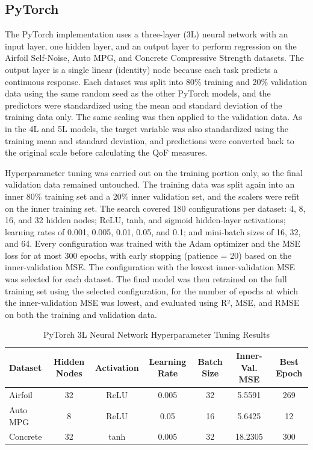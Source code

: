\documentclass{article}
\begin{document}
\subsection{PyTorch}
The PyTorch implementation uses a three-layer (3L) neural network with an input layer, one hidden layer, and an output layer to perform regression on the Airfoil Self-Noise, Auto MPG, and Concrete Compressive Strength datasets. The output layer is a single linear (identity) node because each task predicts a continuous response. Each dataset was split into 80\% training and 20\% validation data using the same random seed as the other PyTorch models, and the predictors were standardized using the mean and standard deviation of the training data only. The same scaling was then applied to the validation data. As in the 4L and 5L models, the target variable was also standardized using the training mean and standard deviation, and predictions were converted back to the original scale before calculating the QoF measures.
\medskip

Hyperparameter tuning was carried out on the training portion only, so the final validation data remained untouched. The training data was split again into an inner 80\% training set and a 20\% inner validation set, and the scalers were refit on the inner training set. The search covered 180 configurations per dataset: 4, 8, 16, and 32 hidden nodes; ReLU, tanh, and sigmoid hidden-layer activations; learning rates of 0.001, 0.005, 0.01, 0.05, and 0.1; and mini-batch sizes of 16, 32, and 64. Every configuration was trained with the Adam optimizer and the MSE loss for at most 300 epochs, with early stopping (patience = 20) based on the inner-validation MSE. The configuration with the lowest inner-validation MSE was selected for each dataset. The final model was then retrained on the full training set using the selected configuration, for the number of epochs at which the inner-validation MSE was lowest, and evaluated using R², MSE, and RMSE on both the training and validation data.
\medskip
\begin{table}[H]
    \centering
    \caption{PyTorch 3L Neural Network Hyperparameter Tuning Results}
    \label{tab:pytorch3l_hyperparameters}
    \small
    \begin{tabular}{lcccccc}
        \hline
        \textbf{Dataset} & \textbf{Hidden Nodes} & \textbf{Activation} & \textbf{Learning Rate} & \textbf{Batch Size} & \textbf{Inner-Val. MSE} & \textbf{Best Epoch} \\
        \hline
        Airfoil  & 32 & ReLU & 0.005 & 32 & 5.5591 & 269 \\
        Auto MPG & 8  & ReLU & 0.05  & 16 & 5.6425 & 12 \\
        Concrete & 32 & tanh & 0.005 & 32 & 18.2305 & 300 \\
        \hline
    \end{tabular}
\end{table}
\end{document}

